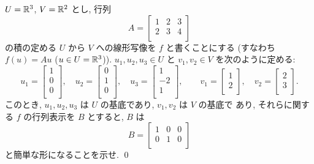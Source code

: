 \documentclass[12pt,twoside]{jarticle}
\begin{document}
\begin{question}[5点]
  $U={\mathbb R}^3$, $V={\mathbb R}^2$ とし, 行列 
  \begin{equation*}
    A = 
    \begin{bmatrix}
      1 & 2 & 3 \\
      2 & 3 & 4 \\
    \end{bmatrix}
  \end{equation*}
  の積の定める $U$ から $V$ への線形写像を $f$ と書くことにする
  (すなわち $f(u)=Au$ ($u\in U={\mathbb R}^3$)).
  $u_1,u_2,u_3\in U$ と $v_1,v_2\in V$ を次のように定める:
  \begin{equation*}
    u_1 =
    \begin{bmatrix}
      1 \\ 0 \\ 0 \\
    \end{bmatrix},
    \quad
    u_2 =
    \begin{bmatrix}
      0 \\ 1 \\ 0 \\
    \end{bmatrix},
    \quad
    u_3 =
    \begin{bmatrix}
      1 \\ -2 \\ 1 \\
    \end{bmatrix},
    \qquad
    v_1 =
    \begin{bmatrix}
      1 \\ 2 \\
    \end{bmatrix},
    \quad
    v_2 =
    \begin{bmatrix}
      2 \\ 3 \\
    \end{bmatrix}.
  \end{equation*}
  このとき, $u_1,u_2,u_3$ は $U$ の基底であり, $v_1,v_2$ は $V$ の基底で
  あり, それらに関する $f$ の行列表示を $B$ とすると, $B$ は
  \begin{equation*}
    B =
    \begin{bmatrix}
      1 & 0 & 0 \\
      0 & 1 & 0 \\
    \end{bmatrix}
  \end{equation*}
  と簡単な形になることを示せ. \qed
\end{question}
\end{document}

